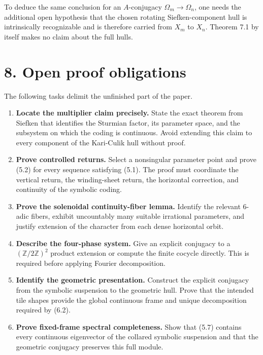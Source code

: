 \documentclass[11pt]{article}
\begin{document}
To deduce the same conclusion for an \(A\)-conjugacy
\(\Omega_m\to\Omega_n\), one needs the additional open hypothesis that the
chosen rotating Siefken-component hull is intrinsically recognizable and is
therefore carried from \(X_m\) to \(X_n\). Theorem 7.1 by itself makes no
claim about the full hulls.

\section*{8. Open proof obligations}

The following tasks delimit the unfinished part of the paper.

\begin{enumerate}
\item \textbf{Locate the multiplier claim precisely.} State the exact theorem from
   Siefken that identifies the Sturmian factor, its parameter space, and the
   subsystem on which the coding is continuous. Avoid extending this claim
   to every component of the Kari-Culik hull without proof.

\item \textbf{Prove controlled returns.} Select a nonsingular parameter point and
   prove (5.2) for every sequence satisfying (5.1). The proof must coordinate
   the vertical return, the winding-sheet return, the horizontal correction,
   and continuity of the symbolic coding.

\item \textbf{Prove the solenoidal continuity-fiber lemma.} Identify the relevant
   \(6\)-adic fibers, exhibit uncountably many suitable irrational
   parameters, and justify extension of the character from each dense
   horizontal orbit.

\item \textbf{Describe the four-phase system.} Give an explicit conjugacy to a
   \((\mathbb Z/2\mathbb Z)^2\) product extension or compute the finite
   cocycle directly. This is required before applying Fourier decomposition.

\item \textbf{Identify the geometric presentation.} Construct the explicit
   conjugacy from the symbolic suspension to the geometric hull. Prove that
   the intended tile shapes provide the global continuous frame and unique
   decomposition required by (6.2).

\item \textbf{Prove fixed-frame spectral completeness.} Show that (5.7) contains
   every continuous eigenvector of the collared symbolic suspension and that
   the geometric conjugacy preserves this full module.


\end{enumerate}
\end{document}
